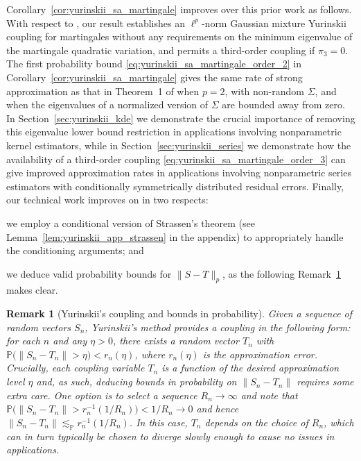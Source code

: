 \documentclass[11pt,lof]{puthesis}
\renewcommand{\P}{\ensuremath{\mathbb{P}}}
\theoremstyle{break}
\newtheorem{remark}{Remark}[section]
\theoremstyle{proof}
\begin{document}
Corollary~\ref{cor:yurinskii_sa_martingale} improves over this prior work as
follows.
With respect to \citet{li2020uniform}, our result establishes an $\ell^p$-norm
Gaussian mixture Yurinskii coupling for martingales without any requirements on
the minimum eigenvalue of the martingale quadratic variation, and permits a
third-order coupling if $\pi_3=0$. The first probability bound
\eqref{eq:yurinskii_sa_martingale_order_2} in
Corollary~\ref{cor:yurinskii_sa_martingale} gives the
same rate of strong approximation as that in Theorem~1 of \citet{li2020uniform}
when $p=2$, with non-random $\Sigma$, and when the eigenvalues of a normalized
version of $\Sigma$ are bounded away from zero. In
Section~\ref{sec:yurinskii_kde} we
demonstrate the crucial importance of removing this eigenvalue lower bound
restriction in applications involving nonparametric kernel estimators, while in
Section~\ref{sec:yurinskii_series} we demonstrate how the availability of a
third-order
coupling \eqref{eq:yurinskii_sa_martingale_order_3} can give improved
approximation rates
in applications involving nonparametric series estimators with conditionally
symmetrically distributed residual errors. Finally, our technical work improves
on \citet{li2020uniform} in two respects:
%
\begin{inlineroman}
  \item
    we employ a conditional version
    of Strassen's theorem (see Lemma~\ref{lem:yurinskii_app_strassen}
    in the appendix)
    to appropriately handle the conditioning arguments; and
  \item
    we deduce valid
    probability bounds for $\|S-T\|_p$, as the following
    Remark~\ref{rem:yurinskii_coupling_bounds_probability} makes clear.
\end{inlineroman}

\begin{remark}[Yurinskii's coupling and bounds in probability]
  \label{rem:yurinskii_coupling_bounds_probability}
  Given a sequence of random vectors $S_n$, Yurinskii's method provides a
  coupling in the following form: for each $n$ and any $\eta > 0$, there exists
  a random vector $T_n$ with $\P\big(\|S_n - T_n\| > \eta\big) < r_n(\eta)$,
  where $r_n(\eta)$ is the approximation error. Crucially, each coupling
  variable $T_n$ is a function of the desired approximation level $\eta$ and,
  as such, deducing bounds in probability on $\|S_n - T_n\|$ requires some
  extra care. One option is to select a sequence $R_n \to \infty$ and note that
  $\P\big(\|S_n - T_n\| > r_n^{-1}(1 / R_n)\big) < 1 / R_n \to 0$ and hence
  $\|S_n - T_n\| \lesssim_\P r_n^{-1}(1 / R_n)$. In this case, $T_n$ depends on
  the choice of $R_n$, which can in turn typically be chosen to diverge slowly
  enough to cause no issues in applications.
\end{remark}
\end{document}
